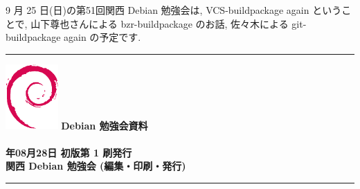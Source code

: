 \documentclass[mingoth,a4paper]{jsarticle}
\newcommand{\debmtgyear}{2011}
\newcommand{\debmtgmonth}{08}
\newcommand{\debmtgdate}{28}
\begin{document}
9 月 25 日(日)の第51回関西 Debian 勉強会は,
VCS-buildpackage again ということで,
山下尊也さんによる bzr-buildpackage のお話,
佐々木による git-buildpackage again の予定です.



\printindex

 \begin{minipage}[b]{0.2\hsize}
 \end{minipage}
 \begin{minipage}[b]{0.8\hsize}

 \vspace*{15cm}
 \rule{\hsize}{1mm}
 \vspace{2mm}
 \includegraphics[width=2cm]{image200502/openlogo-nd.eps}
 \noindent \Large \bf Debian 勉強会資料\\ \\
 \noindent \normalfont \debmtgyear{}年\debmtgmonth{}月\debmtgdate{}日 \hspace{5mm}  初版第 1 刷発行\\
 \noindent \normalfont 関西 Debian 勉強会 (編集・印刷・発行)\\
 \rule{\hsize}{1mm}
 \end{minipage}
\end{document}
